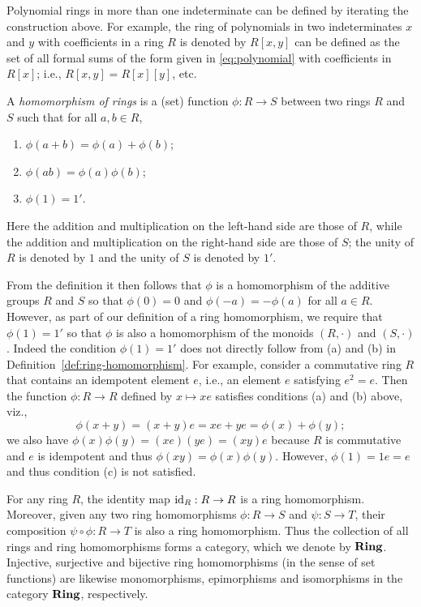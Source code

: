 \begin{example}
    Polynomial rings in more than one indeterminate can be defined by iterating
    the construction above. For example, the ring of polynomials in two
    indeterminates \(x\) and \(y\) with coefficients in a ring \(R\) is denoted
    by \(R[x, y]\) can be defined as the set of all formal sums of the form
    given in \eqref{eq:polynomial} with coefficients in \(R[x]\); i.e., \(R[x,
    y] = R[x][y]\), etc.
\end{example}

\begin{definition}
    \label{def:ring-homomorphism}
    A \emph{homomorphism of rings} is a (set) function \(\phi: R \to S\) between
    two rings \(R\) and \(S\) such that for all \(a, b \in R\),
    \begin{enumerate}[label=(\alph*)]
        \item \(\phi(a + b) = \phi(a) + \phi(b)\);
        \item \(\phi(ab) = \phi(a)\phi(b)\);
        \item \(\phi(1) = 1'\).
    \end{enumerate}
    Here the addition and multiplication on the left-hand side are those of
    \(R\), while the addition and multiplication on the right-hand side are
    those of \(S\); the unity of \(R\) is denoted by \(1\) and the unity of
    \(S\) is denoted by \(1'\).
\end{definition}

From the definition it then follows that \(\phi\) is a homomorphism of the
additive groups \(R\) and \(S\) so that \(\phi(0) = 0\) and \(\phi(-a) =
-\phi(a)\) for all \(a \in R\). However, as part of our definition of a ring
homomorphism, we require that \(\phi(1) = 1'\) so that \(\phi\) is also a
homomorphism of the monoids \((R, \cdot)\) and \((S, \cdot)\). Indeed the
condition \(\phi(1) = 1'\) does not directly follow from (a) and (b) in
Definition~\ref{def:ring-homomorphism}. For example, consider a commutative ring
\(R\) that contains an idempotent element \(e\), i.e., an element \(e\)
satisfying \(e^2 = e\). Then the function \(\phi: R \to R\) defined by \(x
\mapsto xe\) satisfies conditions (a) and (b) above, viz., \[\phi(x + y) = (x +
y)e = xe + ye = \phi(x) + \phi(y);\] we also have \(\phi(x) \phi(y) = (xe)(ye) =
(xy)e\) because \(R\) is commutative and \(e\) is idempotent and thus \(\phi(xy)
= \phi(x) \phi(y)\). However, \(\phi(1) = 1e = e\) and thus condition (c) is not
satisfied.

For any ring \(R\), the identity map \(\operatorname{id}_R: R \to R\) is a ring homomorphism.
Moreover, given any two ring homomorphisms \(\phi: R \to S\) and \(\psi: S \to
T\), their composition \(\psi \circ \phi: R \to T\) is also a ring homomorphism.
Thus the collection of all rings and ring homomorphisms forms a category, which
we denote by \(\mathbf{Ring}\). Injective, surjective and bijective ring homomorphisms
(in the sense of set functions) are likewise monomorphisms, epimorphisms and
isomorphisms in the category \(\mathbf{Ring}\), respectively.

